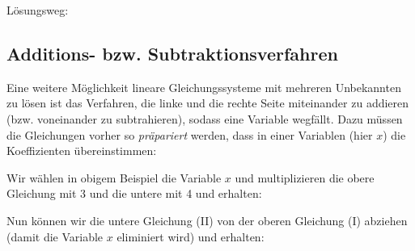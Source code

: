 Lösungsweg:

  \newpage

\subsection{Additions- bzw. Subtraktionsverfahren}
Eine weitere Möglichkeit lineare Gleichungssysteme mit mehreren Unbekannten zu lösen ist das Verfahren, die linke und die rechte Seite miteinander zu addieren (bzw. voneinander zu subtrahieren), sodass eine Variable wegfällt. Dazu müssen die Gleichungen vorher so \textit{präpariert} werden, dass in einer Variablen (hier \zB $x$) die Koeffizienten übereinstimmen:


Wir wählen \zB in obigem Beispiel die Variable $x$ und multiplizieren die obere Gleichung mit 3 und die untere mit 4 und
erhalten:




Nun können wir die untere Gleichung (II) von der oberen Gleichung (I) abziehen (damit die Variable $x$ eliminiert wird)
und erhalten:
  
